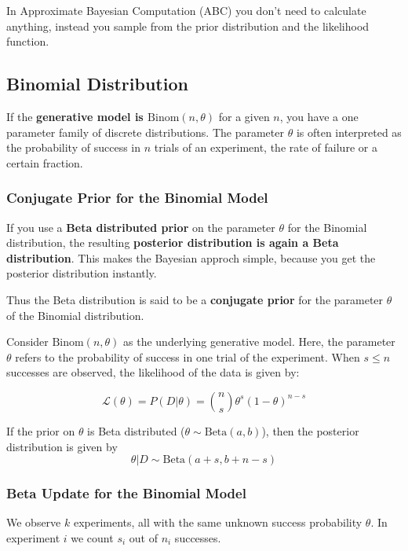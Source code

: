 \documentclass[11pt]{article}
\begin{document}
In Approximate Bayesian Computation (ABC) you don't need to calculate anything, instead you sample from the prior distribution and the likelihood function.

\subsection{Binomial Distribution}
If the \textbf{generative model is $\text{Binom}(n,\theta)$} for a given $n$, you have a one parameter family of discrete distributions. The parameter $\theta$ is often interpreted as the probability of success in $n$ trials of an experiment, the rate of failure or a certain fraction.

\subsubsection{Conjugate Prior for the Binomial Model}

If you use a \textbf{Beta distributed prior} on the parameter $\theta$ for the Binomial distribution, the resulting \textbf{posterior distribution is again a Beta distribution}. This makes the Bayesian approch simple, because you get the posterior distribution instantly. 

Thus the Beta distribution is said to be a \textbf{conjugate prior} for the parameter $\theta$ of the Binomial distribution.

Consider $\text{Binom}(n, \theta)$ as the underlying generative model. Here, the parameter $\theta$ refers to the probability of success in one trial of the experiment. When $s\leq n$ successes are observed, the likelihood of the data is given by:

\begin{equation*}
	\mathcal{L}(\theta) = P(D|\theta) = \binom{n}{s}\theta^s(1-\theta)^{n-s}
\end{equation*}

If the prior on $\theta$ is Beta distributed ($\theta \sim \text{Beta}(a,b)$), then the posterior distribution is given by 
\begin{equation*}
	\theta|D \sim \text{Beta}(a + s, b + n - s)
\end{equation*}

\subsubsection{Beta Update for the Binomial Model}
We observe $k$ experiments, all with the same unknown success probability $\theta$. In experiment $i$ we count $s_i$ out of $n_i$ successes.
\end{document}
